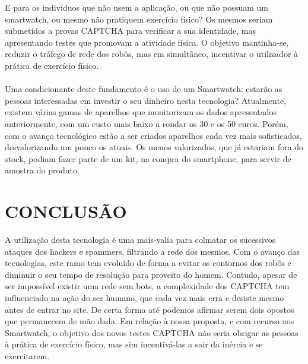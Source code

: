 \documentclass{article}
\begin{document}
	E para os indivíduos que não usem a aplicação, ou que não possuam um smartwatch, ou mesmo não pratiquem exercício físico? Os mesmos seriam submetidos a provas CAPTCHA para verificar a sua identidade, mas apresentando testes que promovam a atividade física. O objetivo mantinha-se, reduzir o tráfego de rede dos robôs, mas em simultâneo, incentivar o utilizador à prática de exercício físico. 



	  \paragraph{}  Uma condicionante deste fundamento é o uso de um Smartwatch: estarão as pessoas interessadas em investir o seu dinheiro nesta tecnologia? Atualmente, existem várias gamas de aparelhos que monitorizam os dados apresentados anteriormente, com um custo mais baixo a rondar os 30 e os 50 euros. Porém, com o avanço tecnológico estão a ser criados aparelhos cada vez mais sofisticados, desvalorizando um pouco os atuais. Os menos valorizados, que já estariam fora do stock, podiam fazer parte de um kit, na compra do smartphone, para servir de amostra do produto.
		
\section{CONCLUSÃO}
A utilização desta tecnologia é uma mais-valia para colmatar os sucessivos ataques dos hackers e spammers, filtrando a rede dos mesmos. Com o avanço das tecnologias, este ramo tem evoluído de forma a evitar os contornos dos robôs e diminuir o seu tempo de resolução para proveito do homem. Contudo, apesar de ser impossível existir uma rede sem bots, a complexidade dos CAPTCHA tem influenciado na ação do ser humano, que cada vez mais erra e desiste mesmo antes de entrar no site. De certa forma até podemos afirmar serem dois opostos que permanecem de mão dada. Em relação à nossa proposta, e com recurso aos Smartwatch, o objetivo dos novos testes CAPTCHA não seria obrigar as pessoas à prática de exercício físico, mas sim incentivá-las a sair da inércia e se exercitarem.


 	



 
 
\end{document}
